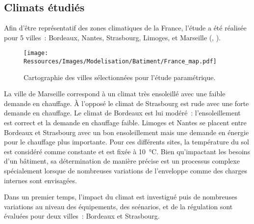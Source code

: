 \subsection{Climats étudiés} %
\label{sub:climats_etudies}
Afin d’être représentatif des zones climatiques de la France, l’étude a été réalisée
pour 5 villes~: Bordeaux, Nantes, Strasbourg, Limoges, et Marseille (,
).

\begin{figure}
    \centering
    \texttt{[image: Ressources/Images/Modelisation/Batiment/France\_map.pdf]}
    \caption[Cartographie des villes sélectionnées pour l’étude paramétrique]
            {Cartographie des villes sélectionnées pour l’étude paramétrique.}
    \label{fig:carte_france}
\end{figure}

La ville de Marseille correspond à un climat très ensoleillé avec une faible demande en
chauffage. À l’opposé le climat de Strasbourg est rude avec
une forte demande en chauffage. Le climat de Bordeaux est lui modéré~: l’ensoleillement est correct
et la demande en chauffage faible. Limoges et Nantes se placent entre Bordeaux et
Strasbourg avec un bon ensoleillement mais une demande en énergie pour le chauffage plus
importante. Pour ces différents sites, la température du sol est
considéré comme constante et est fixée à \SI{10}{\celsius}. Bien qu’impactant les besoins
d’un bâtiment, sa détermination de manière précise est un processus complexe spécialement
lorsque de nombreuses variations de l’enveloppe comme des charges internes sont envisagées.

Dans un premier temps, l’impact du climat est investigué puis de nombreuses variations au
niveau des équipements, des scénarios, et de la régulation sont évaluées pour deux
villes~: Bordeaux et Strasbourg.

